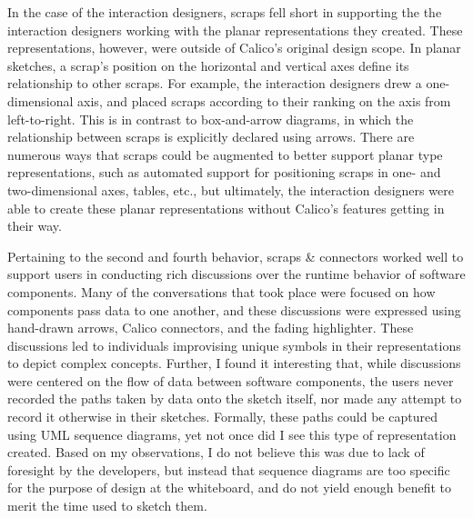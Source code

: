 \documentclass[12pt,fleqn]{ucithesis}
\begin{document}
In the case of the interaction designers, scraps fell short in supporting the the interaction designers working with the planar representations they created. These representations, however, were outside of Calico's original design scope. In planar sketches, a scrap's position on the horizontal and vertical axes define its relationship to other scraps. For example, the interaction designers drew a one-dimensional axis, and placed scraps according to their ranking on the axis from left-to-right. This is in contrast to box-and-arrow diagrams, in which the relationship between scraps is explicitly declared using arrows. There are numerous ways that scraps could be augmented to better support planar type representations, such as automated support for positioning scraps in one- and two-dimensional axes, tables, etc., but ultimately, the interaction designers were able to create these planar representations without Calico's features getting in their way. 

Pertaining to the second and fourth behavior, scraps \& connectors worked well to support users in conducting rich discussions over the runtime behavior of software components. Many of the conversations that took place were focused on how components pass data to one another, and these discussions were expressed using hand-drawn arrows, Calico connectors, and the fading highlighter. These discussions led to individuals improvising unique symbols in their representations to depict complex concepts. Further, I found it interesting that, while discussions were centered on the flow of data between software components, the users never recorded the paths taken by data onto the sketch itself, nor made any attempt to record it otherwise in their sketches. Formally, these paths could be captured using UML sequence diagrams, yet not once did I see this type of representation created. Based on my observations, I do not believe this was due to lack of foresight by the developers, but instead that sequence diagrams are too specific for the purpose of design at the whiteboard, and do not yield enough benefit to merit the time used to sketch them.

\end{document}
